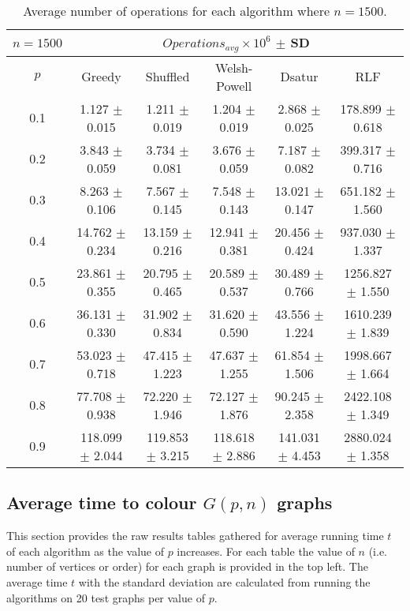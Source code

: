 \begin{table}[H]
    \centering
    \begin{tabular}{cccccc}
        
        $n = 1500$& \multicolumn{5}{c}{$Operations_{avg}\times10^6$ $\pm$ SD} \\
        \hline
        $p$ & Greedy & Shuffled & Welsh-Powell & Dsatur & RLF \\
        \hline
           0.1 & 1.127 $\pm$ 0.015 & 1.211 $\pm$ 0.019 & 1.204 $\pm$ 0.019 & 2.868 $\pm$ 0.025 & 178.899 $\pm$ 0.618 \\
        0.2 & 3.843 $\pm$ 0.059 & 3.734 $\pm$ 0.081 & 3.676 $\pm$ 0.059 & 7.187 $\pm$ 0.082 & 399.317 $\pm$ 0.716 \\
        0.3 & 8.263 $\pm$ 0.106 & 7.567 $\pm$ 0.145 & 7.548 $\pm$ 0.143 & 13.021 $\pm$ 0.147 & 651.182 $\pm$ 1.560 \\
        0.4 & 14.762 $\pm$ 0.234 & 13.159 $\pm$ 0.216 & 12.941 $\pm$ 0.381 & 20.456 $\pm$ 0.424 & 937.030 $\pm$ 1.337 \\
        0.5 & 23.861 $\pm$ 0.355 & 20.795 $\pm$ 0.465 & 20.589 $\pm$ 0.537 & 30.489 $\pm$ 0.766 & 1256.827 $\pm$ 1.550 \\
        0.6 & 36.131 $\pm$ 0.330 & 31.902 $\pm$ 0.834 & 31.620 $\pm$ 0.590 & 43.556 $\pm$ 1.224 & 1610.239 $\pm$ 1.839 \\
        0.7 & 53.023 $\pm$ 0.718 & 47.415 $\pm$ 1.223 & 47.637 $\pm$ 1.255 & 61.854 $\pm$ 1.506 & 1998.667 $\pm$ 1.664 \\
        0.8 & 77.708 $\pm$ 0.938 & 72.220 $\pm$ 1.946 & 72.127 $\pm$ 1.876 & 90.245 $\pm$ 2.358 & 2422.108 $\pm$ 1.349 \\
        0.9 & 118.099 $\pm$ 2.044 & 119.853 $\pm$ 3.215 & 118.618 $\pm$ 2.886 & 141.031 $\pm$ 4.453 & 2880.024 $\pm$ 1.358 \\
        \hline
    \end{tabular}
    \caption{Average number of operations for each algorithm where $n = 1500$.}
    \label{tab:avgOpsforV1500}
\end{table}

\subsection{Average time to colour $G(p,n)$ graphs}

This section provides the raw results tables gathered for average running time $t$ of each algorithm as the value of $p$ increases. For each table the value of $n$ (i.e. number of vertices or order) for each graph is provided in the top left. The average time $t$ with the standard deviation are calculated from running the algorithms on 20 test graphs per value of $p$.

